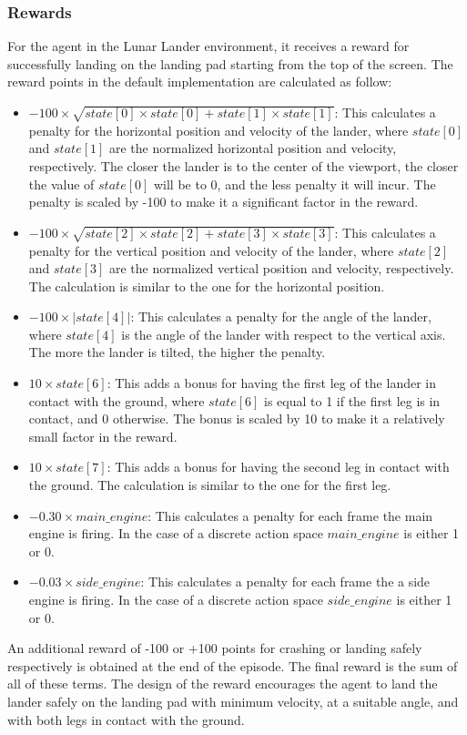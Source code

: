 \subsubsection{Rewards}
For the agent in the Lunar Lander environment, it receives a reward for successfully landing on the landing pad starting from the top of the screen. The reward points in the default implementation are calculated as follow:
\begin{itemize}
  \item $-100 \times \sqrt{state[0] \times state[0] + state[1] \times state[1]}$: This calculates a penalty for the horizontal position and velocity of the lander, where $state[0]$ and $state[1]$ are the normalized horizontal position and velocity, respectively. The closer the lander is to the center of the viewport, the closer the value of $state[0]$ will be to 0, and the less penalty it will incur. The penalty is scaled by -100 to make it a significant factor in the reward.

  \item $-100 \times\sqrt{state[2] \times state[2] + state[3] \times state[3]}$: This calculates a penalty for the vertical position and velocity of the lander, where $state[2]$ and $state[3]$ are the normalized vertical position and velocity, respectively. The calculation is similar to the one for the horizontal position.

  \item $-100 \times \lvert state[4] \rvert$: This calculates a penalty for the angle of the lander, where $state[4]$ is the angle of the lander with respect to the vertical axis. The more the lander is tilted, the higher the penalty.

  \item $10 \times state[6]$: This adds a bonus for having the first leg of the lander in contact with the ground, where $state[6]$ is equal to 1 if the first leg is in contact, and 0 otherwise. The bonus is scaled by 10 to make it a relatively small factor in the reward.

  \item $10 \times state[7]$:  This adds a bonus for having the second leg in contact with the ground. The calculation is similar to the one for the first leg.

  \item $-0.30 \times main\_engine$: This calculates a penalty for each frame the main engine is firing. In the case of a discrete action space $main\_engine$ is either 1 or 0.

  \item $-0.03 \times side\_engine$: This calculates a penalty for each frame the a side engine is firing. In the case of a discrete action space $side\_engine$ is either 1 or 0.

\end{itemize}
An additional reward of -100 or +100 points for crashing or landing safely respectively is obtained at the end of the episode. The final reward is the sum of all of these terms. The design of the reward encourages the agent to land the lander safely on the landing pad with minimum velocity, at a suitable angle, and with both legs in contact with the ground.

